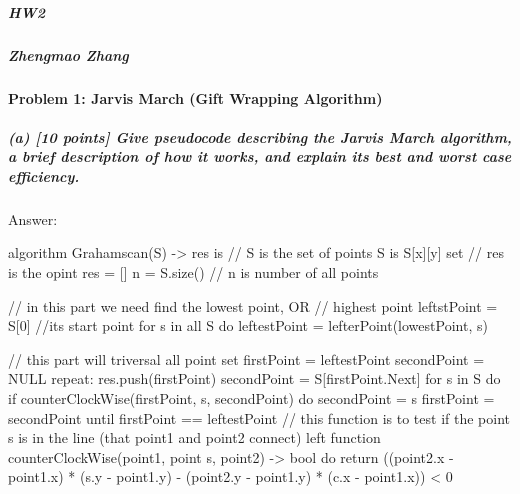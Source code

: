 \documentclass[
]{article}
\author{}
\date{}
\newenvironment{Shaded}{}{}
\newcommand{\NormalTok}[1]{#1}
\begin{document}
\hypertarget{hw2}{%
\subparagraph{HW2}\label{hw2}}

\hypertarget{zhengmao-zhang}{%
\subparagraph{Zhengmao Zhang}\label{zhengmao-zhang}}

\hypertarget{problem-1-jarvis-march-gift-wrapping-algorithm}{%
\paragraph{Problem 1: Jarvis March (Gift Wrapping
Algorithm)}\label{problem-1-jarvis-march-gift-wrapping-algorithm}}

\hypertarget{a-10-points-give-pseudocode-describing-the-jarvis-march-algorithm-a-brief-description-of-how-it-works-and-explain-its-best-and-worst-case-efficiency}{%
\subparagraph{(a) {[}10 points{]} Give pseudocode describing the Jarvis
March algorithm, a brief description of how it works, and explain its
best and worst case
efficiency.}\label{a-10-points-give-pseudocode-describing-the-jarvis-march-algorithm-a-brief-description-of-how-it-works-and-explain-its-best-and-worst-case-efficiency}}

Answer:

\begin{Shaded}
\begin{Highlighting}[]
\NormalTok{algorithm Grahamscan(S) {-}\textgreater{} res is}
\NormalTok{	// S is the set of points S is S[x][y] set}
\NormalTok{	// res is the opint }
\NormalTok{	res = []}
\NormalTok{	n = S.size() // n is number of all points}
	
\NormalTok{	// in this part we need find the lowest point, OR}
\NormalTok{	// highest point}
\NormalTok{	leftstPoint = S[0] //its start point}
\NormalTok{	for s in all S do}
\NormalTok{		leftestPoint = lefterPoint(lowestPoint, s)}
	
\NormalTok{	// this part will triversal all point set}
\NormalTok{	firstPoint = leftestPoint}
\NormalTok{	secondPoint = NULL}
\NormalTok{	repeat:}
\NormalTok{		res.push(firstPoint)}
\NormalTok{		secondPoint = S[firstPoint.Next]}
\NormalTok{		for s in S do}
\NormalTok{			if counterClockWise(firstPoint, s, secondPoint) do}
\NormalTok{				secondPoint = s}
\NormalTok{		firstPoint = secondPoint}
\NormalTok{ until firstPoint == leftestPoint}
\NormalTok{// this function is to test if the point s is in the line (that point1 and point2 connect) left}
\NormalTok{function counterClockWise(point1, point s, point2) {-}\textgreater{} bool do}
\NormalTok{	return ((point2.x {-} point1.x) * (s.y {-} point1.y) {-} (point2.y {-} point1.y) * (c.x {-} point1.x)) \textless{} 0}
\end{Highlighting}
\end{Shaded}
\end{document}
